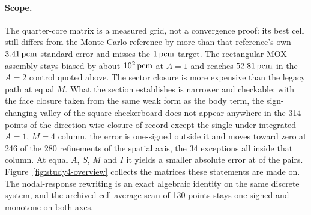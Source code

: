 \paragraph{Scope.}
The quarter-core matrix is a measured grid, not a convergence proof: its best
cell still differs from the Monte Carlo reference by more than that
reference's own $3.41\,\mathrm{pcm}$ standard error and misses the $1\,\mathrm{pcm}$ target. The rectangular MOX assembly stays
biased by about $10^2\,\mathrm{pcm}$ at $A{=}1$ and reaches $52.81\,\mathrm{pcm}$ in the $A{=}2$ control quoted above. The sector
closure is more expensive than the legacy path at equal $M$. What the
section establishes is narrower and checkable: with the face closure taken
from the same weak form as the body term, the sign-changing valley of the
square checkerboard does not appear anywhere in the 314 points of the
direction-wise closure of record except the single under-integrated
$A{=}1$, $M{=}4$ column, the error is one-signed outside it and moves toward
zero at 246 of the 280 refinements of the spatial axis, the 34 exceptions all
inside that column. At equal $A$, $S$, $M$ and $I$ it yields a smaller absolute error at
\StudyFourSmaller{} of the \StudyFourPairs{} pairs. Figure~\ref{fig:study4-overview} collects the matrices these
statements are made on. The nodal-response rewriting is an exact
algebraic identity on the same discrete system, and the archived
cell-average scan of 130 points stays one-signed and monotone on both axes.
